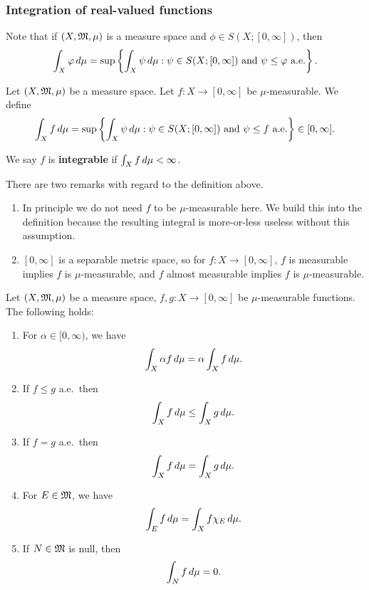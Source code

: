 \documentclass[a4paper]{article}
\begin{document}
\subsubsection{Integration of real-valued functions}

Note that if $(X, \mathfrak{M}, \mu)$ is a measure space and $\phi \in S(X; [0,
\infty])$, then
\[
  \int_X \varphi \, d\mu =
  \sup \left\{ \int_X \psi \, d\mu :
  \psi \in S(X; [0, \infty]) \text{ and $\psi \leq \varphi$
  a.e.} \right\}.
\]

\begin{defi}
  Let $(X, \mathfrak{M}, \mu)$ be a measure space. Let $f : X \to [0, \infty]$ be
  $\mu$-measurable. We define
  \[
    \int_X f \, d\mu =
    \sup \left\{ \int_X \psi \, d\mu:
    \text{$\psi \in S(X; [0, \infty])$ and
  $\psi \leq f$ a.e.} \right\}
    \in [0, \infty].
  \]

  We say $f$ is \textbf{integrable} if $\int_X f \, d \mu < \infty$.
\end{defi}

\begin{remark}
  There are two remarks with regard to the definition above.
  \begin{enumerate}
    \item In principle we do not need $f$ to be $\mu$-measurable here. We
          build this into the definition because the resulting integral is
          more-or-less useless without this assumption.
    \item $[0, \infty]$ is a separable metric space,
          so for $f : X \to [0, \infty]$,
          $f$ is measurable implies $f$ is $\mu$-measurable,
          and $f$ almost measurable implies $f$ is $\mu$-measurable.
  \end{enumerate}
\end{remark}

\begin{thm}
  Let $(X, \mathfrak{M}, \mu)$ be a measure space, $f, g : X \to [0, \infty]$ be
  $\mu$-measurable functions. The following holds:
  \begin{enumerate}
    \item For $\alpha \in [0, \infty)$, we have
          \[
            \int_X \alpha f \, d \mu = \alpha \int_X f \, d \mu.
          \]
    \item If $f \leq g$ a.e.\, then
          \[
            \int_X f \, d \mu \leq \int_X g \, d \mu.
          \]
    \item If $f = g$ a.e.\, then
          \[
            \int_X f \, d \mu = \int_X g \, d \mu.
          \]
    \item For $E \in \mathfrak{M}$, we have
          \[
            \int_E f \, d \mu = \int_X f \chi_E \, d \mu.
          \]
    \item If $N \in \mathfrak{M}$ is null, then
          \[
            \int_N f \, d \mu = 0.
          \]
  \end{enumerate}
\end{thm}
\end{document}

